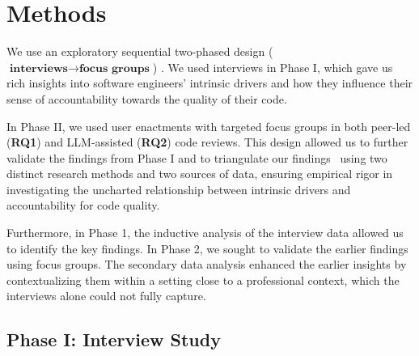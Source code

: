 \section{Methods}\label{sec:methods}

\noindent We use an exploratory sequential two-phased design ($\textbf{interviews} \rightarrow \textbf{focus groups}$) \citep{creswell2017designing}. We used interviews in Phase I, which gave us rich insights into software engineers' intrinsic drivers and how they influence their sense of accountability towards the quality of their code.

In Phase II, we used user enactments with targeted focus groups in both peer-led (\textbf{RQ1}) and LLM-assisted (\textbf{RQ2}) code reviews. This design allowed us to further validate the findings from Phase I and to triangulate our findings~\citep{Storey2020} using two distinct research methods and two sources of data, ensuring empirical rigor in investigating the uncharted relationship between intrinsic drivers and accountability for code quality.

Furthermore, in Phase 1, the inductive analysis of the interview data allowed us to identify the key findings. In Phase 2, we sought to validate the earlier findings using focus groups. The secondary data analysis enhanced the earlier insights by contextualizing them within a setting close to a professional context, which the interviews alone could not fully capture.


\subsection{Phase I: Interview Study}


